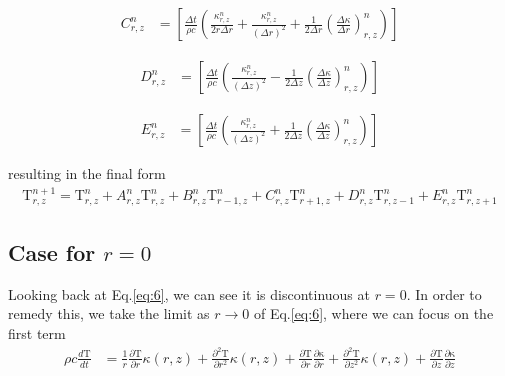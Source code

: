 \documentclass[12pt]{article}
\begin{document}
		\begin{equation}
		\begin{aligned}
		C^n_{r, z} &=  \left [ \frac{\Delta t}{\rho c}\left (\frac{\kappa^n_{r, z}}{2r\Delta r} + \frac{\kappa^n_{r, z}}{(\Delta r)^2} + \frac{1}{2\Delta r}\left(\frac{\Delta\kappa}{\Delta r}\right)^n_{r, z} \right ) \right ]
		\end{aligned}
		\end{equation}
		
  \begin{equation}
		\begin{aligned}
		D^n_{r, z} &= \left [ \frac{\Delta t}{\rho c}\left (\frac{\kappa^n_{r, z}}{(\Delta z)^2} - \frac{1}{2\Delta z}\left(\frac{\Delta\kappa}{\Delta z}\right)^n_{r, z} \right ) \right ]
		\end{aligned}
  \end{equation}
		
		\begin{equation}
		\begin{aligned}
		E^n_{r, z} &= \left [ \frac{\Delta t}{\rho c}\left ( \frac{\kappa^n_{r, z}}{(\Delta z)^2} + \frac{1}{2\Delta z}\left(\frac{\Delta\kappa}{\Delta z}\right )^n_{r, z} \right ) \right ] 
		\end{aligned}
		\end{equation}

      resulting in the final form
		\begin{equation}
		\begin{aligned}
		\mathrm{T}^{n+1}_{r, z} = \mathrm{T}^{n}_{r, z}  + A^n_{r, z}\mathrm{T}^{n}_{r, z} + B^n_{r, z}\mathrm{T}^{n}_{r - 1, z}  + C^n_{r, z}\mathrm{T}^{n}_{r + 1, z}  + D^n_{r, z}\mathrm{T}^{n}_{r, z - 1}  + E^n_{r, z}\mathrm{T}^{n}_{r, z + 1}  
		\end{aligned}
		\end{equation}

    \subsection{Case for $r=0$}
      Looking back at Eq.\ref{eq:6}, we can see it is discontinuous at $r=0$. In order to remedy this, we take the limit as $r\rightarrow0$ of Eq.\ref{eq:6}, where we can focus on the first term
      \begin{equation}
        \begin{aligned}
          \rho c \frac{d\mathrm{T}}{dt} &= \frac{1}{r} \frac{\partial\mathrm{T}}{\partial r}\kappa(r, z) + \frac{\partial^2\mathrm{T}}{\partial r^2}\kappa(r, z)  + \frac{\partial\mathrm{T}}{\partial r} \frac{\partial\mathrm{\kappa}}{\partial r}  + \frac{\partial^2\mathrm{T}}{\partial z^2}\kappa(r, z) + \frac{\partial\mathrm{T}}{\partial z}\frac{\partial\mathrm{\kappa}}{\partial z} \\
        \end{aligned}
      \end{equation}	
\end{document}
